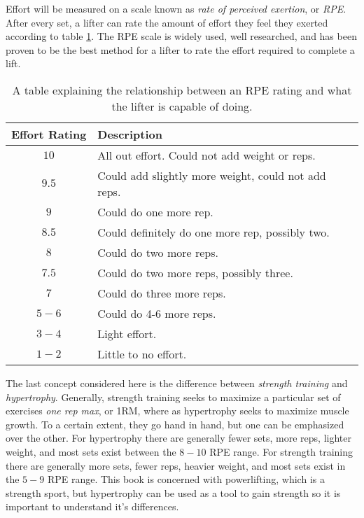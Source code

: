 Effort will be measured on a scale known as \textit{rate of perceived exertion}, or \textit{RPE}. After every set, a lifter can rate the amount of effort they feel they exerted according to table \ref{tab:RPETable}. The RPE scale is widely used, well researched, and has been proven to be the best method for a lifter to rate the effort required to complete a lift. \cite{RPE_ACCURACY}

\begin{table}[h]
    \centering
    \begin{tabular}{c|l}
        Effort Rating & Description \\
        \hline
        $10$ & All out effort. Could not add weight or reps. \\
        $9.5$ & Could add slightly more weight, could not add reps. \\
        $9$ & Could do one more rep. \\
        $8.5$ & Could definitely do one more rep, possibly two. \\
        $8$ & Could do two more reps. \\
        $7.5 $& Could do two more reps, possibly three. \\
        $7$ & Could do three more reps. \\
        $5-6$ & Could do 4-6 more reps. \\
        $3-4$ & Light effort. \\
        $1-2$ & Little to no effort.
    \end{tabular}
    \caption{A table explaining the relationship between an RPE rating and what the lifter is capable of doing.}
    \label{tab:RPETable}
\end{table}

The last concept considered here is the difference between \textit{strength training} and \textit{hypertrophy}. Generally, strength training seeks to maximize a particular set of exercises \textit{one rep max}, or 1RM, where as hypertrophy seeks to maximize muscle growth. To a certain extent, they go hand in hand, but one can be emphasized over the other. For hypertrophy there are generally fewer sets, more reps, lighter weight, and most sets exist between the $8-10$ RPE range. For strength training there are generally more sets, fewer reps, heavier weight, and most sets exist in the $5-9$ RPE range. This book is concerned with powerlifting, which is a strength sport, but hypertrophy can be used as a tool to gain strength so it is important to understand it's differences.

